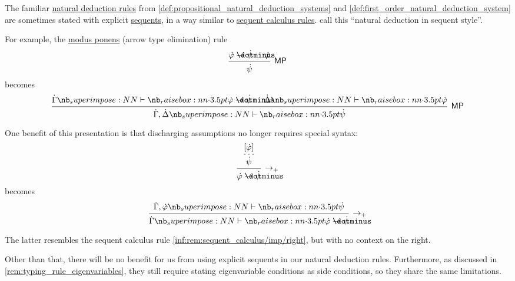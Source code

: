 \begin{remark}\label{rem:natural_deduction_explicit_sequents}
  The familiar \hyperref[def:natural_deduction_rule]{natural deduction rules} from \cref{def:propositional_natural_deduction_systems} and \cref{def:first_order_natural_deduction_system} are sometimes stated with explicit \hyperref[def:sequent]{sequents}, in a way similar to \hyperref[def:sequent_calculus_rule]{sequent calculus rules}.  call this \enquote{natural deduction in sequent style}.

  For example, the \hyperref[thm:axiomatic_derivation_as_natural_deduction/mp]{modus ponens} (arrow type elimination) rule
  \begin{equation*}
    \begin{prooftree}
      \hypo{ \syn\varphi \synimplies \syn\psi }
      \hypo{ \syn\varphi }
      \infer2[\ensuremath{ \logic{MP} }]{ \syn\psi }
    \end{prooftree}
  \end{equation*}
  becomes
  \begin{equation*}
    \begin{prooftree}
      \hypo{ \syn\Gamma \synvdash \syn\varphi \synimplies \syn\psi }
      \hypo{ \syn\Delta \synvdash \syn\varphi }
      \infer2[\ensuremath{ \logic{MP} }]{ \syn\Gamma, \syn\Delta \synvdash \syn\psi }
    \end{prooftree}
  \end{equation*}

  One benefit of this presentation is that discharging assumptions no longer requires special syntax:
  \begin{equation*}
    \begin{prooftree}
      \hypo{ [\syn\varphi] }
      \infer[dashed]1{ \syn\psi }
      \infer1[\ensuremath{ \rightarrow_+ }]{ \syn\varphi \synimplies \syn\psi }
    \end{prooftree}
  \end{equation*}
  becomes
  \begin{equation*}
    \begin{prooftree}
      \hypo{ \syn\Gamma, \syn\varphi \synvdash \syn\psi }
      \infer1[\ensuremath{ \rightarrow_+ }]{ \syn\Gamma \synvdash \syn\varphi \synimplies \syn\psi }
    \end{prooftree}
  \end{equation*}

  The latter resembles the sequent calculus rule \ref{inf:rem:sequent_calculus/imp/right}, but with no context on the right.

  Other than that, there will be no benefit for us from using explicit sequents in our natural deduction rules. Furthermore, as discussed in \cref{rem:typing_rule_eigenvariables}, they still require stating eigenvariable conditions as side conditions, so they share the same limitations.
\end{remark}
